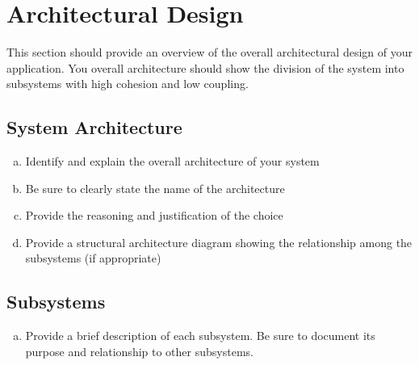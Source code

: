 \documentclass[]{article}
\begin{document}



\section{Architectural Design}
\label{sec:architectural_design}
This section should provide an overview of the overall architectural design of your application. You overall architecture should show the division of the system into subsystems with high cohesion and low coupling.

\subsection{System Architecture}
\label{sub:system_architecture}
\begin{enumerate}[a)]
	\item Identify and explain the overall architecture of your system
	\item Be sure to clearly state the name of the architecture
	\item Provide the reasoning and justification of the choice
	\item Provide a structural architecture diagram showing the relationship among the subsystems (if appropriate)
\end{enumerate}

\subsection{Subsystems}
\label{sub:subsystems}
\begin{enumerate}[a)]
	\item Provide a brief description of each subsystem. Be sure to document its purpose and relationship to other subsystems.
\end{enumerate}

\end{document}
